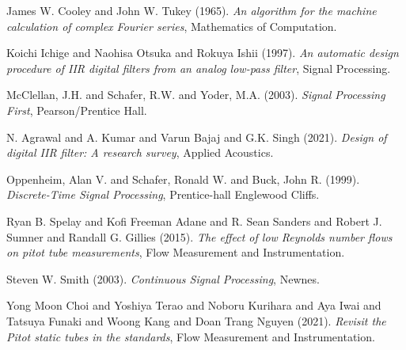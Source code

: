 \documentclass[11pt]{article}
\begin{document}
\noindent
James W. Cooley and John W. Tukey (1965). \emph{{An algorithm for the machine calculation of complex Fourier series}}, Mathematics of Computation.

\noindent
Koichi Ichige and Naohisa Otsuka and Rokuya Ishii (1997). \emph{An automatic design procedure of IIR digital filters from an analog low-pass filter}, Signal Processing.

\noindent
McClellan, J.H. and Schafer, R.W. and Yoder, M.A. (2003). \emph{Signal Processing First}, Pearson/Prentice Hall.

\noindent
N. Agrawal and A. Kumar and Varun Bajaj and G.K. Singh (2021). \emph{Design of digital IIR filter: A research survey}, Applied Acoustics.

\noindent
Oppenheim, Alan V. and Schafer, Ronald W. and Buck, John R. (1999). \emph{Discrete-Time Signal Processing}, Prentice-hall Englewood Cliffs.

\noindent
Ryan B. Spelay and Kofi Freeman Adane and R. Sean Sanders and Robert J. Sumner and Randall G. Gillies (2015). \emph{The effect of low Reynolds number flows on pitot tube measurements}, Flow Measurement and Instrumentation.

\noindent
Steven W. Smith (2003). \emph{Continuous Signal Processing}, Newnes.

\noindent
Yong Moon Choi and Yoshiya Terao and Noboru Kurihara and Aya Iwai and Tatsuya Funaki and Woong Kang and Doan Trang Nguyen (2021). \emph{Revisit the Pitot static tubes in the standards}, Flow Measurement and Instrumentation.
\end{document}
